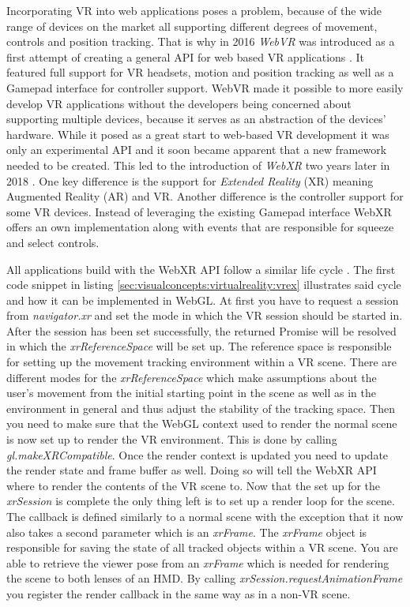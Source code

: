 Incorporating VR into web applications poses a problem, because of the wide range of devices on the market all supporting different degrees of movement, controls and position tracking. That is why in 2016 \textit{WebVR} was introduced as a first attempt of creating a general API for web based VR applications \cite{BibEntry2018Sep, WebVRIntro}. It featured full support for VR headsets, motion and position tracking as well as a Gamepad interface for controller support. WebVR made it possible to more easily develop VR applications without the developers being concerned about supporting multiple devices, because it serves as an abstraction of the devices' hardware. While it posed as a great start to web-based VR development it was only an experimental API and it soon became apparent that a new framework needed to be created. This led to the introduction of \textit{WebXR} two years later in 2018 \cite{BibEntry2022Jul}. One key difference is the support for \textit{Extended Reality} (XR) meaning Augmented Reality (AR) and VR. Another difference is the controller support for some VR devices. Instead of leveraging the existing Gamepad interface WebXR offers an own implementation along with events that are responsible for squeeze and select controls.

All applications build with the WebXR API follow a similar life cycle \cite{BibEntry2022Aug}. The first code snippet in listing \ref{sec:visualconcepts:virtualreality:vrex} illustrates said cycle and how it can be implemented in WebGL. At first you have to request a session from \textit{navigator.xr} and set the mode in which the VR session should be started in. After the session has been set successfully, the returned Promise will be resolved in which the \textit{xrReferenceSpace} will be set up. The reference space is responsible for setting up the movement tracking environment within a VR scene. There are different modes for the \textit{xrReferenceSpace} which make assumptions about the user's movement from the initial starting point in the scene as well as in the environment in general and thus adjust the stability of the tracking space. Then you need to make sure that the WebGL context used to render the normal scene is now set up to render the VR environment. This is done by calling \textit{gl.makeXRCompatible}. Once the render context is updated you need to update the render state and frame buffer as well. Doing so will tell the WebXR API where to render the contents of the VR scene to. Now that the set up for the \textit{xrSession} is complete the only thing left is to set up a render loop for the scene. The callback is defined similarly to a normal scene with the exception that it now also takes a second parameter which is an \textit{xrFrame}. The \textit{xrFrame} object is responsible for saving the state of all tracked objects within a VR scene. You are able to retrieve the viewer pose from an \textit{xrFrame} which is needed for rendering the scene to both lenses of an HMD. By calling \textit{xrSession.requestAnimationFrame} you register the render callback in the same way as in a non-VR scene.

